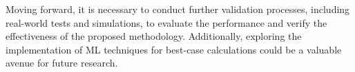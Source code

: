 Moving forward, it is necessary to conduct further validation processes, including real-world tests and simulations, to evaluate the performance and verify the effectiveness of the proposed methodology. Additionally, exploring the implementation of \acrshort{ML} techniques for best-case calculations could be a valuable avenue for future research.


